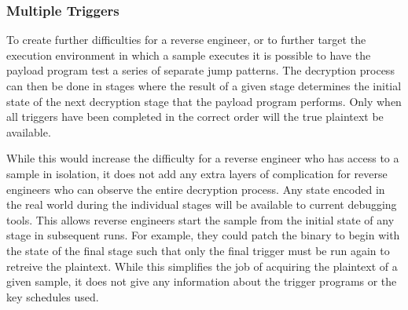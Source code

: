 \subsubsection{Multiple Triggers}
To create further difficulties for a reverse engineer, or to further target
the execution environment in which a sample executes it is possible
to have the payload program test a series of separate jump patterns. The decryption
process can then be done in stages where the result of a given stage determines 
the initial state of the next decryption stage that the payload program 
performs. Only when all triggers have been completed in the correct order will
the true plaintext be available. 

While this would increase the difficulty for a reverse engineer who has access
to a sample in isolation, it  does not add any extra layers of complication 
for reverse engineers who can observe the entire decryption process. Any state 
encoded in the real world during the individual stages will be available to current 
debugging tools. This allows reverse engineers start the sample from the initial
state of any stage in subsequent runs. For example, they could patch the 
binary to begin with the state of the final stage such that only the final 
trigger must be run again to retreive the plaintext. While this simplifies the 
job of acquiring the plaintext of a given \speculake sample, it does not give any 
information about the trigger programs or the key schedules used. 


